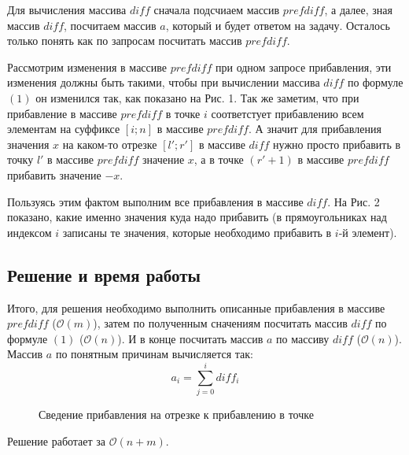 \documentclass{article}
\begin{document}
Для вычисления массива $diff$ сначала подсчиаем массив $prefdiff$, а далее, зная массив $diff$, посчитаем массив $a$, который и будет ответом на задачу. Осталось только понять как по запросам посчитать массив $prefdiff$. 

\qquad Рассмотрим изменения в массиве $prefdiff$ при одном запросе прибавления, эти изменения должны быть такими, чтобы при вычислении массива $diff$ по формуле $(1)$ он изменился так, как показано на Рис. 1. Так же заметим, что при прибавление в массиве $prefdiff$ в точке $i$ соответстует прибавлению всем элементам на суффиксе $[i; n]$ в массиве $prefdiff$. А значит для прибавления значения $x$ на каком-то отрезке $[l'; r']$ в массиве $diff$ нужно просто прибавить в точку $l'$ в массиве $prefdiff$ значение $x$, а в точке $(r' + 1)$ в массиве $prefdiff$ прибавить значение $-x$. 

\qquad Пользуясь этим фактом выполним все прибавления в массиве $diff$.  На Рис. 2 показано, какие именно значения куда надо прибавить (в прямоугольниках над индексом $i$ записаны те значения, которые необходимо прибавить в $i$-й элемент).

\subsection*{Решение и время работы} 
\qquad Итого, для решения необходимо выполнить описанные прибавления в массиве $prefdiff$ ($\mathcal{O}(m)$), затем по полученным сначениям посчитать массив $diff$ по формуле $(1)$ ($\mathcal{O}(n)$). И в конце посчитать массив $a$ по массиву $diff$ ($\mathcal{O}(n)$). Массив $a$ по понятным причинам вычисляется так: 
$$a_i = \sum_{j = 0}^{i}diff_i$$
\begin{figure}[h!]
	\caption{Сведение прибавления на отрезке к прибавлению в точке}
	\label{fig:image}
\end{figure}
Решение работает за $\mathcal{O}(n + m)$.
\end{document}
